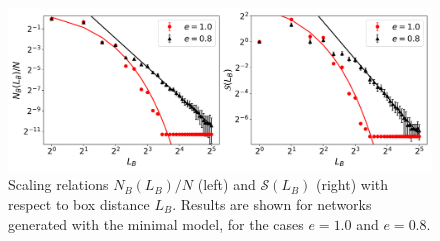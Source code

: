 \begin{figure}[!h]
	\begin{center}
	\includegraphics[scale=0.46]{./images/task_6/N_B_and_S_vs_L_B.png} 
	\end{center}
	\caption{Scaling relations $N_B(L_B) / N$ (left) and $\mathcal{S}(L_B)$ (right) with respect to box distance $L_B$. Results are shown for networks generated with the minimal model, for the cases $e=1.0$ and $e=0.8$.\\} 
	\label{fig:N_B_and_S_vs_L_B} 
\end{figure}





\newpage